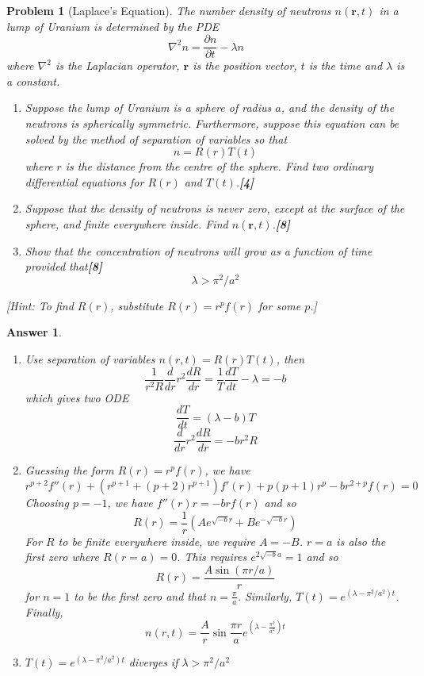 \documentclass[a4paper]{article}
\newtheorem{ans}{Answer}[section]
\theoremstyle{new}
\newtheorem{qns}{Problem}[section]
\begin{document}
\newpage
\begin{qns}[Laplace's Equation]
The number density of neutrons $n(\mathbf{r},t)$ in a lump of Uranium is determined by the PDE
$$\nabla^2n=\frac{\partial n}{\partial t}-\lambda n$$
where $\nabla^2$ is the Laplacian operator, $\mathbf{r}$ is the position vector, $t$ is the time and $\lambda$ is a constant.
\begin{enumerate}[label=(\alph*)]
\item Suppose the lump of Uranium is a sphere of radius $a$, and the density of the neutrons is spherically symmetric. Furthermore, suppose this equation can be solved by the method of separation of variables so that
$$n=R(r)T(t)$$
where $r$ is the distance from the centre of the sphere. Find two ordinary differential equations for $R(r)$ and $T(t)$.\hfill \textbf{[4]}
\item Suppose that the density of neutrons is never zero, except at the surface of the sphere, and finite everywhere inside. Find $n(\mathbf{r},t)$.\hfill \textbf{[8]}
\item Show that the concentration of neutrons will grow as a function of time provided that\hfill \textbf{[8]} $$\lambda>\pi^2/a^2$$
\end{enumerate}
[Hint: To find $R(r)$, substitute $R(r)=r^pf(r)$ for some $p$.]
\end{qns}
\begin{ans}\leavevmode
\begin{enumerate}[label=(\alph*)]
    \item Use separation of variables $n(r,t)=R(r)T(t)$, then
$$\frac{1}{r^2R}\frac{d}{dr}r^2\frac{dR}{dr}=\frac{1}{T}\frac{dT}{dt}-\lambda=-b$$
which gives two ODE
\begin{equation}
\frac{dT}{dt}=(\lambda-b)T\tag{time}
\end{equation} 
\begin{equation}
\frac{d}{dr}r^2\frac{dR}{dr}=-br^2R\tag{radial}
\end{equation}
\item Guessing the form $R(r)=r^pf(r)$, we have
$$r^{p+2}f''(r)+(r^{p+1}+(p+2)r^{p+1})f'(r)+p(p+1)r^p-br^{2+p}f(r)=0$$
Choosing $p=-1$, we have $f''(r)r=-brf(r)$ and so
$$R(r)=\frac{1}{r}(Ae^{\sqrt{-b}r}+Be^{-\sqrt{-b}r})$$
For $R$ to be finite everywhere inside, we require $A=-B$. $r=a$ is also the first zero where $R(r=a)=0$. This requires $e^{2\sqrt{-b}a}=1$ and so 
$$R(r)=\frac{A\sin(\pi r/a)}{r}$$
for $n=1$ to be the first zero and that $n=\frac{\pi}{a}$. Similarly, $T(t)=e^{(\lambda-\pi^2/a^2)t}$. Finally,
$$n(r,t)=\frac{A}{r}\sin\frac{\pi r}{a}e^{(\lambda-\frac{\pi^2}{a^2})t}$$
\item $T(t)=e^{(\lambda-\pi^2/a^2)t}$ diverges if $\lambda>\pi^2/a^2$
\end{enumerate}
\end{ans}
\end{document}
